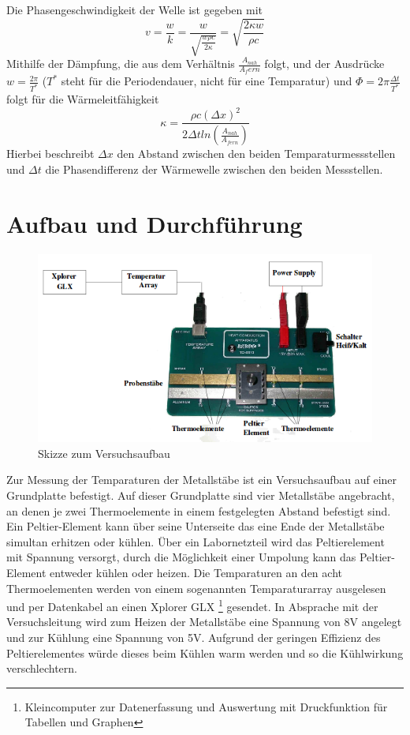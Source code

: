 \documentclass[11pt]{article}
\begin{document}
Die Phasengeschwindigkeit der Welle ist gegeben mit
\begin{equation}
v = \frac{w}{k} = \frac{w}{\sqrt{\frac{w \rho c}{2 \kappa}}} = \sqrt{\frac{2 \kappa w}{\rho c}}
\end{equation}
Mithilfe der Dämpfung, die aus dem Verhältnis $\frac{A_{nah}}{A_fern}$ folgt, und der Ausdrücke $w = \frac{2 \pi}{T^*}$ ($T^*$ steht für die Periodendauer, nicht für eine Temparatur) und $\Phi = 2 \pi \frac{\Delta t}{T^*}$ folgt für die Wärmeleitfähigkeit
\begin{equation}
\kappa = \frac{\rho c (\Delta x)^2}{2 \Delta t ln(\frac{A_{nah}}{A_{fern}})}
\end{equation}
Hierbei beschreibt $\Delta x$ den Abstand zwischen den beiden Temparaturmessstellen und $\Delta t$ die Phasendifferenz der Wärmewelle zwischen den beiden Messstellen.
\section{Aufbau und Durchf\"{u}hrung}
\begin{figure}[htp]
\centering
\includegraphics[width=\textwidth ]{Diagramme/v204aufbau.png}
\caption{Skizze zum Versuchsaufbau}
\label{aufbau}
\end{figure}
Zur Messung der Temparaturen der Metallstäbe ist ein Versuchsaufbau auf einer Grundplatte befestigt. Auf dieser Grundplatte sind vier Metallstäbe angebracht, an denen je zwei Thermoelemente in einem festgelegten Abstand befestigt sind. Ein Peltier-Element kann über seine Unterseite das eine Ende der Metallstäbe simultan erhitzen oder kühlen. Über ein Labornetzteil wird das Peltierelement mit Spannung versorgt, durch die Möglichkeit einer Umpolung kann das Peltier-Element entweder kühlen oder heizen. Die Temparaturen an den acht Thermoelementen werden von einem sogenannten Temparaturarray ausgelesen und per Datenkabel an einen Xplorer GLX \footnote{Kleincomputer zur Datenerfassung und Auswertung mit Druckfunktion für Tabellen und Graphen} gesendet.
In Absprache mit der Versuchsleitung wird zum Heizen der Metallstäbe eine Spannung von 8V angelegt und zur Kühlung eine Spannung von 5V. Aufgrund der geringen Effizienz des Peltierelementes würde dieses beim Kühlen warm werden und so die Kühlwirkung verschlechtern.
\end{document}
